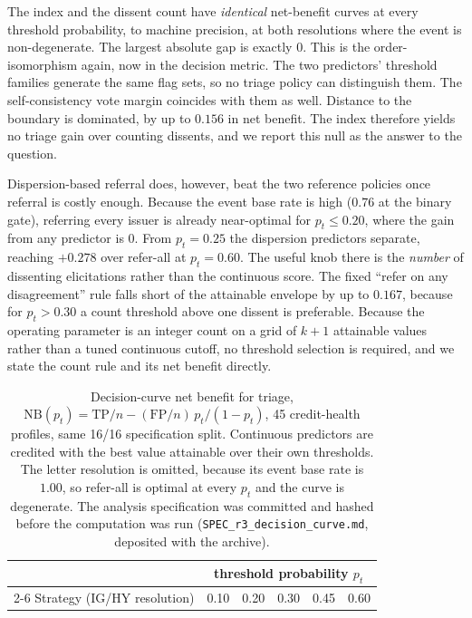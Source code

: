 \documentclass[a4paper,fleqn]{cas-sc}
\begin{document}
The index and the dissent count have \emph{identical} net-benefit curves at every threshold
probability, to machine precision, at both resolutions where the event is non-degenerate. The
largest absolute gap is exactly $0$. This is the order-isomorphism again, now in the decision metric. The two predictors' threshold families generate the same flag sets, so no triage policy can
distinguish them. The self-consistency vote margin coincides with them as well. Distance to the
boundary is dominated, by up to $0.156$ in net benefit. The index therefore yields no triage gain
over counting dissents, and we report this null as the answer to the question.

Dispersion-based referral does, however, beat the two reference policies once referral is costly
enough. Because the event base rate is high ($0.76$ at the binary gate), referring every issuer is
already near-optimal for $p_t\le0.20$, where the gain from any predictor is $0$. From $p_t=0.25$ the
dispersion predictors separate, reaching $+0.278$ over refer-all at $p_t=0.60$. The useful knob there
is the \emph{number} of dissenting elicitations rather than the continuous score. The fixed ``refer on
any disagreement'' rule falls short of the attainable envelope by up to $0.167$, because for
$p_t>0.30$ a count threshold above one dissent is preferable. Because the operating parameter is an integer count on a grid of $k+1$ attainable values rather than a tuned continuous cutoff, no threshold selection is required, and we state the count rule and its net benefit directly.

\begin{table}[t]\centering
\caption{Decision-curve net benefit for triage, $\mathrm{NB}(p_t)=\mathrm{TP}/n-(\mathrm{FP}/n)
\,p_t/(1-p_t)$, 45 credit-health profiles, same 16/16 specification split. Continuous predictors are credited with
the best value attainable over their own thresholds. The letter resolution is omitted, because its event base rate is $1.00$, so refer-all is optimal at every $p_t$ and the curve is degenerate. The analysis
specification was committed and hashed before the computation was run
(\texttt{SPEC\_r3\_decision\_curve.md}, deposited with the archive).}
\label{tab:sisdca}
\begin{tabular}{lccccc}\toprule
& \multicolumn{5}{c}{threshold probability $p_t$} \\\cmidrule(l){2-6}
Strategy (IG/HY resolution) & 0.10 & 0.20 & 0.30 & 0.45 & 0.60 \\\midrule%

\end{tabular}\end{table}
\end{document}
